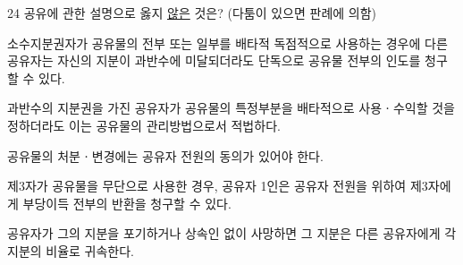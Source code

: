 \begin{question}{24}
공유에 관한 설명으로 옳지 \uline{않은} 것은? (다툼이 있으면 판례에 의함)
\begin{choices}
  \item 소수지분권자가 공유물의 전부 또는 일부를 배타적 독점적으로 사용하는 경우에 다른 공유자는 자신의 지분이 과반수에 미달되더라도 단독으로 공유물 전부의 인도를 청구할 수 있다.
  \item 과반수의 지분권을 가진 공유자가 공유물의 특정부분을 배타적으로 사용ㆍ수익할 것을 정하더라도 이는 공유물의 관리방법으로서 적법하다.
  \item 공유물의 처분ㆍ변경에는 공유자 전원의 동의가 있어야 한다.
  \item 제3자가 공유물을 무단으로 사용한 경우, 공유자 1인은 공유자 전원을 위하여 제3자에게 부당이득 전부의 반환을 청구할 수 있다.
  \item 공유자가 그의 지분을 포기하거나 상속인 없이 사망하면 그 지분은 다른 공유자에게 각 지분의 비율로 귀속한다.
\end{choices}
\end{question}
